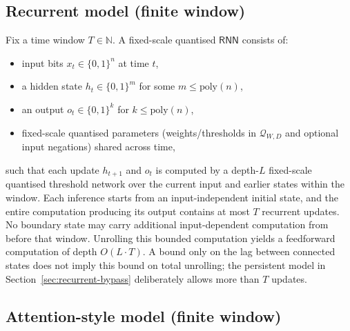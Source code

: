 \documentclass[twoside,11pt]{article}
\newcommand{\poly}{\mathrm{poly}}
\newcommand{\RNN}{\mathsf{RNN}}
\newcommand{\bits}{\{0,1\}}
\newcommand{\N}{\mathbb{N}}
\newcommand{\Qset}{\mathcal{Q}}
\numberwithin{theorem}{section}
\numberwithin{equation}{section}
\begin{document}
\subsection{Recurrent model (finite window)}
\label{app:RNN}

\begin{definition}
\label{def:RNN-formal}
Fix a time window $T\in\N$.
A fixed-scale quantised $\RNN$ consists of:
\begin{itemize}[leftmargin=*]
\item input bits $x_t\in\bits^n$ at time $t$,
\item a hidden state $h_t\in\bits^{m}$ for some $m\le \poly(n)$,
\item an output $o_t\in\bits^{k}$ for $k\le \poly(n)$,
\item fixed-scale quantised parameters (weights/thresholds in $\Qset_{W,D}$ and optional input negations) shared across time,
\end{itemize}
such that each update $h_{t+1}$ and $o_t$ is computed by a depth-$L$ fixed-scale quantised threshold network over the current input and earlier states within the window.
Each inference starts from an input-independent initial state, and the entire computation producing its output contains at most $T$ recurrent updates. No boundary state may carry additional input-dependent computation from before that window.
Unrolling this bounded computation yields a feedforward computation of depth $O(L\cdot T)$.
A bound only on the lag between connected states does not imply this bound on total unrolling; the persistent model in Section~\ref{sec:recurrent-bypass} deliberately allows more than $T$ updates.
\end{definition}

\subsection{Attention-style model (finite window)}
\label{app:LTST}
\end{document}
